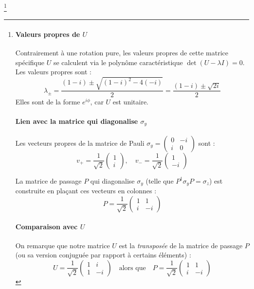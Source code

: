 \footnote{
\paragraph*{Valeurs propres de $U$}
Contrairement à une rotation pure, les valeurs propres de cette matrice spécifique $U$ se calculent via le polynôme caractéristique $\det(U - \lambda I) = 0$. 
Les valeurs propres sont :
\begin{equation}
    \lambda_{\pm} = \frac{(1-i) \pm \sqrt{(1-i)^2 - 4(-i)}}{2} = \frac{(1-i) \pm \sqrt{2i}}{2}
\end{equation}
Elles sont de la forme $e^{i \phi}$, car $U$ est unitaire.

\paragraph*{Lien avec la matrice qui diagonalise $\sigma_y$}
Les vecteurs propres de la matrice de Pauli $\sigma_y = \begin{pmatrix} 0 & -i \\ i & 0 \end{pmatrix}$ sont :
\begin{equation}
    v_+ = \frac{1}{\sqrt{2}} \begin{pmatrix} 1 \\ i \end{pmatrix}, \quad
    v_- = \frac{1}{\sqrt{2}} \begin{pmatrix} 1 \\ -i \end{pmatrix}
\end{equation}

La matrice de passage $P$ qui diagonalise $\sigma_y$ (telle que $P^\dagger \sigma_y P = \sigma_z$) est construite en plaçant ces vecteurs en colonnes :
\begin{equation}
    P = \frac{1}{\sqrt{2}} \begin{pmatrix} 1 & 1 \\ i & -i \end{pmatrix}
\end{equation}

\paragraph*{Comparaison avec $U$}
On remarque que notre matrice $U$ est la {\em transposée} de la matrice de passage $P$ (ou sa version conjuguée par rapport à certains éléments) :
\begin{equation}
    U = \frac{1}{\sqrt{2}}\begin{pmatrix} 1 & i \\ 1 & -i \end{pmatrix} \quad \text{alors que} \quad P = \frac{1}{\sqrt{2}}\begin{pmatrix} 1 & 1 \\ i & -i \end{pmatrix}
\end{equation}

}
